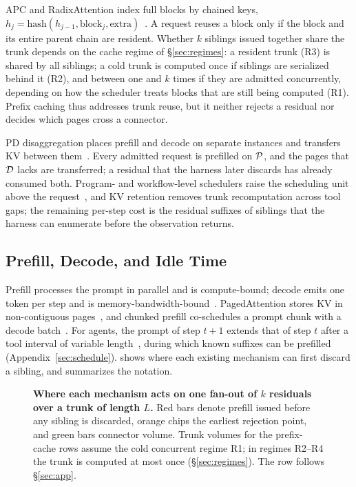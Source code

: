 APC and RadixAttention index full blocks by chained keys, $h_j=\mathrm{hash}(h_{j-1},\text{block}_j,\text{extra})$~\cite{vllm,sglang}.
A request reuses a block only if the block and its entire parent chain are resident.
Whether $k$ siblings issued together share the trunk depends on the cache regime of \S\ref{sec:regimes}: a resident trunk (R3) is shared by all siblings; a cold trunk is computed once if siblings are serialized behind it (R2), and between one and $k$ times if they are admitted concurrently, depending on how the scheduler treats blocks that are still being computed (R1).
Prefix caching thus addresses trunk reuse, but it neither rejects a residual nor decides which pages cross a connector.

PD disaggregation places prefill and decode on separate instances and transfers KV between them~\cite{distserve,splitwise}.
Every admitted request is prefilled on $\mathcal{P}$, and the pages that $\mathcal{D}$ lacks are transferred; a residual that the harness later discards has already consumed both.
Program- and workflow-level schedulers raise the scheduling unit above the request~\cite{autellix,thunderagent,continuum,mori}, and KV retention removes trunk recomputation across tool gaps; the remaining per-step cost is the residual suffixes of siblings that the harness can enumerate before the observation returns.

\subsection{Prefill, Decode, and Idle Time}
Prefill processes the prompt in parallel and is compute-bound; decode emits one token per step and is memory-bandwidth-bound~\cite{orca,distserve,splitwise}.
PagedAttention stores KV in non-contiguous pages~\cite{vllm}, and chunked prefill co-schedules a prompt chunk with a decode batch~\cite{sarathi}.
For agents, the prompt of step $t{+}1$ extends that of step $t$ after a tool interval of variable length~\cite{continuum,mori}, during which known suffixes can be prefilled (Appendix~\ref{sec:schedule}).
 shows where each existing mechanism can first discard a sibling, and  summarizes the notation.

\begin{figure}[t]
\centering
\resizebox{\textwidth}{!}{}
\caption{\textbf{Where each mechanism acts on one fan-out of $k$ residuals over a trunk of length $L$.}
Red bars denote prefill issued before any sibling is discarded, orange chips the earliest rejection point, and green bars connector volume.
Trunk volumes for the prefix-cache rows assume the cold concurrent regime R1; in regimes R2--R4 the trunk is computed at most once (\S\ref{sec:regimes}).
The \sys{} row follows \S\ref{sec:app}.}
\label{fig:trad}
\end{figure}

